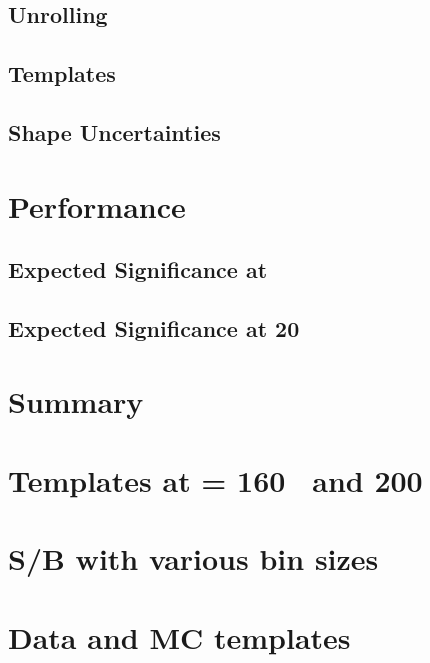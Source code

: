 \documentclass{cmspaper}
\begin{document}
  \subsection{Unrolling}
  \label{sec:unrolling}
  
  
  \subsection{Templates}
  \label{sec:templates}
  
  
  \subsection{Shape Uncertainties}
  \label{sec:shape_uncert}
  

%
\newpage
\section{Performance}
  \label{sec:performance}
  
  
  \subsection{Expected Significance at \intlumiEightTeV }
  \label{sec:exp_significance_5fb}
  
  
  \newpage
  \subsection{Expected Significance at 20~\ifb }
  \label{sec:exp_significance_20fb}
  

%
\newpage
\section{Summary}
     \label{sec:summary}
     



\clearpage 
\appendix
\appendixpage
  \section{Templates at \mHi = 160 \GeV~and 200 \GeV}
     \label{app:templates_160_200}
     
  
  \newpage
  \section{S/B with various bin sizes}
     \label{app:binsize}
     
  
  \newpage
  \section{Data and MC templates}
     \label{app:templates_eyefit}
     
\end{document}
